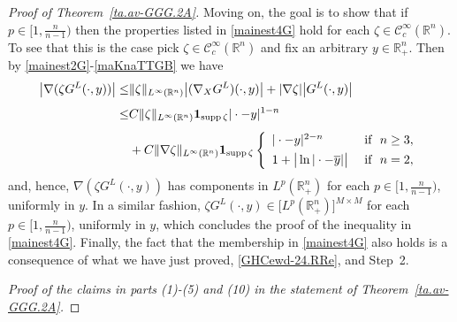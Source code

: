 \documentclass[11pt,reqno]{amsart}
\numberwithin{equation}{section}
\theoremstyle{remark}
\begin{document}
\begin{proof}[Proof of Theorem~\ref{ta.av-GGG.2A}]
Moving on, the goal is to show that if 
$p\in\big[1,\frac{n}{n-1}\big)$ then the properties listed in \eqref{mainest4G} 
hold for each $\zeta\in{\mathscr{C}}^\infty_c({\mathbb{R}}^n)$. To see that this 
is the case pick $\zeta\in{\mathscr{C}}^\infty_c({\mathbb{R}}^n)$ and fix an arbitrary 
$y\in{\mathbb{R}}^n_{+}$. Then by \eqref{mainest2G}-\eqref{maKnaTTGB} we have
%
\begin{align}\label{Uagv-9ybv5RT.5}
\big|\nabla(\zeta G^L(\cdot,y))\big|
\leq &\|\zeta\|_{L^\infty({\mathbb{R}}^n)}\big|(\nabla_X G^L)(\cdot,y)\big|+|\nabla\zeta|\big|G^L(\cdot,y)\big|
\nonumber\\[4pt]
\leq & C\|\zeta\|_{L^\infty({\mathbb{R}}^n)}{\mathbf 1}_{{\rm supp}\,\zeta}|\cdot-y|^{1-n}
\nonumber\\[4pt]
& +C\|\nabla\zeta\|_{L^\infty({\mathbb{R}}^n)}{\mathbf 1}_{{\rm supp}\,\zeta}
\left\{
\begin{array}{ll}
|\cdot-y|^{2-n} &\text{ if }\,\,n\geq 3,
\\[4pt]
1+\big|\ln|\cdot-\overline{y}|\big| &\text{ if }\,\,n=2,
\end{array}
\right.
\end{align} 
%
and, hence, $\nabla(\zeta G^L(\cdot,y))$ has components in $L^p({\mathbb{R}}^n_{+})$ for each 
$p\in\big[1,\frac{n}{n-1}\big)$, uniformly in $y$. In a similar fashion, 
$\zeta G^L(\cdot,y)\in\big[L^p({\mathbb{R}}^n_{+})\big]^{M\times M}$ for each 
$p\in\big[1,\frac{n}{n-1}\big)$, uniformly in $y$, which concludes the 
proof of the inequality in \eqref{mainest4G}. Finally, the fact that 
the membership in \eqref{mainest4G} also holds is a consequence of what 
we have just proved, \eqref{GHCewd-24.RRe}, and Step~2.

\vskip 0.08in
 \textit{Proof of the claims in parts {\it (1)}-{\it (5)} and {\it (10)} 
in the statement of Theorem~\ref{ta.av-GGG.2A}.}
\vskip 0.08in


\end{proof}
\end{document}
